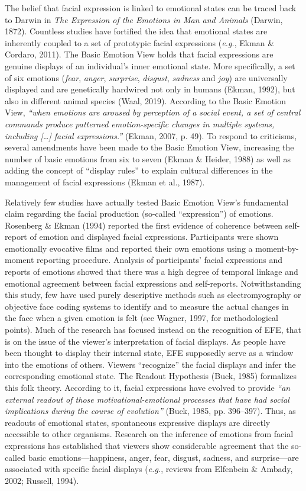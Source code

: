 \documentclass[
  english,
  doc]{apa7}
\begin{document}
The belief that facial expression is linked to emotional states can be traced back to Darwin in \emph{The Expression of the Emotions in Man and Animals} (Darwin, 1872). Countless studies have fortified the idea that emotional states are inherently coupled to a set of prototypic facial expressions (\emph{e.g.}, Ekman \& Cordaro, 2011). The Basic Emotion View holds that facial expressions are genuine displays of an individual's inner emotional state. More specifically, a set of six emotions (\emph{fear}, \emph{anger}, \emph{surprise}, \emph{disgust}, \emph{sadness} and \emph{joy}) are universally displayed and are genetically hardwired not only in humans (Ekman, 1992), but also in different animal species (Waal, 2019). According to the Basic Emotion View, \emph{``when emotions are aroused by perception of a social event, a set of central commands produce patterned emotion-specific changes in multiple systems, including {[}\ldots{]} facial expressions.''} (Ekman, 2007, p. 49). To respond to criticisms, several amendments have been made to the Basic Emotion View, increasing the number of basic emotions from six to seven (Ekman \& Heider, 1988) as well as adding the concept of ``display rules'' to explain cultural differences in the management of facial expressions (Ekman et al., 1987).

Relatively few studies have actually tested Basic Emotion View's fundamental claim regarding the facial production (so-called ``expression'') of emotions. Rosenberg \& Ekman (1994) reported the first evidence of coherence between self-report of emotion and displayed facial expressions. Participants were shown emotionally evocative films and reported their own emotions using a moment-by-moment reporting procedure. Analysis of participants' facial expressions and reports of emotions showed that there was a high degree of temporal linkage and emotional agreement between facial expressions and self-reports. Notwithstanding this study, few have used purely descriptive methods such as electromyography or objective face coding systems to identify and to measure the actual changes in the face when a given emotion is felt (see Wagner, 1997, for methodological points). Much of the research has focused instead on the recognition of EFE, that is on the issue of the viewer's interpretation of facial displays. As people have been thought to display their internal state, EFE supposedly serve as a window into the emotions of others. Viewers ``recognize'' the facial displays and infer the corresponding emotional state. The Readout Hypothesis (Buck, 1985) formalizes this folk theory. According to it, facial expressions have evolved to provide \emph{``an external readout of those motivational-emotional processes that have had social implications during the course of evolution''} (Buck, 1985, pp. 396--397). Thus, as readouts of emotional states, spontaneous expressive displays are directly accessible to other organisms. Research on the inference of emotions from facial expressions has established that viewers show considerable agreement that the so-called basic emotions---happiness, anger, fear, disgust, sadness, and surprise---are associated with specific facial displays (\emph{e.g.}, reviews from Elfenbein \& Ambady, 2002; Russell, 1994).
\end{document}
